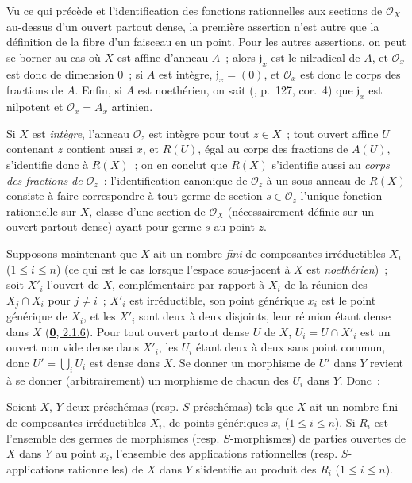 Vu ce qui précède et l'identification des fonctions rationnelles aux sections
de $\mathscr{O}_X$ au-dessus d'un ouvert partout dense, la première assertion
n'est autre que la définition de la fibre d'un faisceau en un point. Pour les
autres assertions, on peut se borner au cas où $X$ est affine d'anneau $A$~;
alors $\mathfrak{j}_x$ est le nilradical de $A$, et $\mathscr{O}_x$ est donc de
dimension 0~; si $A$ est intègre, $\mathfrak{j}_x=(0)$, et $\mathscr{O}_x$ est
donc le corps des fractions de $A$. Enfin, si $A$ est noethérien, on sait
(\cite{I-11}, p.~127, cor.~4) que $\mathfrak{j}_x$ est nilpotent et
$\mathscr{O}_x=A_x$ artinien.

Si $X$ est \emph{intègre}, l'anneau $\mathscr{O}_z$ est intègre pour tout
$z\in X$~; tout ouvert affine $U$ contenant $z$ contient aussi $x$, et $R(U)$,
égal au corps des fractions de $A(U)$, s'identifie donc à $R(X)$~; on en
conclut que $R(X)$ s'identifie aussi au
\emph{corps des fractions de $\mathscr{O}_z$}~: l'identification canonique de
$\mathscr{O}_z$ à un sous-anneau de $R(X)$ consiste à faire correspondre à tout
germe de section $s\in\mathscr{O}_z$ l'unique fonction rationnelle sur $X$,
classe d'une section de $\mathscr{O}_X$ (nécessairement définie sur un ouvert
partout dense) ayant pour germe $s$ au point $z$.

\begin{env}[7.1.6]
\label{I.7.1.6-fr}
Supposons maintenant que $X$ ait un nombre \emph{fini} de composantes
irréductibles $X_i$ ($1\leq i\leq n$) (ce qui est le cas lorsque l'espace
sous-jacent à $X$ est \emph{noethérien})~; soit $X'_i$ l'ouvert de $X$,
complémentaire par rapport à $X_i$ de la réunion des $X_j\cap X_i$ pour
$j\neq i$~; $X'_i$ est irréductible, son point générique $x_i$ est le point
générique de $X_i$, et les $X'_i$ sont deux à deux disjoints, leur réunion
étant dense dans $X$ (\hyperref[0.2.1.6-fr]{\textbf{0}, 2.1.6}). Pour
tout ouvert partout dense $U$ de $X$, $U_i=U\cap X'_i$ est un ouvert non vide
dense dans $X'_i$, les $U_i$ étant deux à deux sans point commun, donc
$U'=\bigcup_i U_i$ est dense dans $X$. Se donner un morphisme de $U'$ dans $Y$
revient à se donner (arbitrairement) un morphisme de chacun des $U_i$ dans $Y$.
Donc~:
\end{env}

\begin{proposition}[7.1.7]
\label{I.7.1.7-fr}
Soient $X$, $Y$ deux préschémas (\textup{resp.} $S$-préschémas) tels que $X$ ait un
nombre fini de composantes irréductibles $X_i$, de points génériques $x_i$
($1\leq i\leq n$). Si $R_i$ est l'ensemble des germes de morphismes (\textup{resp.}
$S$-morphismes) de parties ouvertes de $X$ dans $Y$ au point $x_i$, l'ensemble
des applications rationnelles (\textup{resp.} $S$-applications rationnelles) de $X$
dans $Y$ s'identifie au produit des $R_i$ ($1\leq i\leq n$).
\end{proposition}


